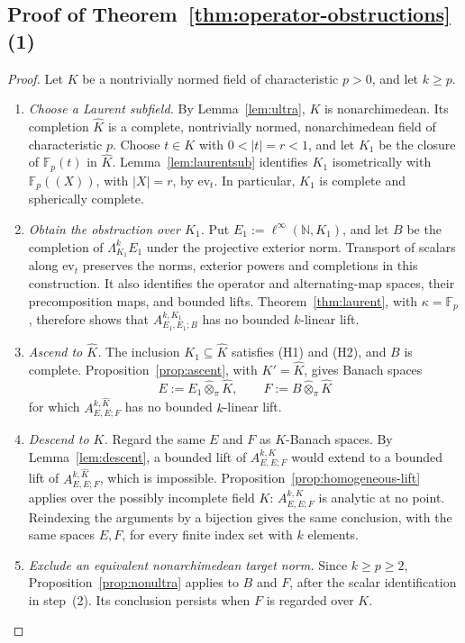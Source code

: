\documentclass[11pt]{amsart}
\theoremstyle{definition}
\theoremstyle{remark}
\numberwithin{equation}{section}
\newcommand{\N}{\mathbb N}
\newcommand{\F}{\mathbb F}
\newcommand{\linf}{\ell^\infty}
\newcommand{\abs}[1]{\lvert #1\rvert}
\newcommand{\Kh}{\widehat K}
\begin{document}
\subsection{Proof of Theorem~\ref{thm:operator-obstructions}(1)}
\begin{proof}
Let $K$ be a nontrivially normed field of characteristic $p>0$, and let $k\ge p$.
\begin{enumerate}
\item \emph{Choose a Laurent subfield.} By Lemma~\ref{lem:ultra}, $K$ is nonarchimedean. Its completion $\Kh$ is
a complete, nontrivially normed, nonarchimedean field of characteristic $p$. Choose $t\in K$ with
$0<\abs t=r<1$, and let $K_1$ be the closure of $\F_p(t)$ in $\Kh$. Lemma~\ref{lem:laurentsub} identifies $K_1$
isometrically with $\F_p((X))$, with $\abs X=r$, by $\mathrm{ev}_t$. In particular, $K_1$ is complete and
spherically complete.
\item \emph{Obtain the obstruction over $K_1$.} Put $E_1:=\linf(\N,K_1)$, and let $B$ be the completion of
$\Lambda^k_{K_1}E_1$ under the projective exterior norm. Transport of scalars along $\mathrm{ev}_t$ preserves
the norms, exterior powers and completions in this construction. It also identifies the operator and
alternating-map spaces, their precomposition maps, and bounded lifts. Theorem~\ref{thm:laurent}, with
$\kappa=\F_p$, therefore shows that $A^{k,K_1}_{E_1,E_1;B}$ has no bounded $k$\nobreakdash-linear lift.
\item \emph{Ascend to $\Kh$.} The inclusion $K_1\subseteq\Kh$ satisfies (H1) and (H2), and $B$ is complete.
Proposition~\ref{prop:ascent}, with $K'=\Kh$, gives Banach spaces
\[
E:=E_1\widehat\otimes_\pi\Kh,\qquad F:=B\widehat\otimes_\pi\Kh
\]
for which $A^{k,\Kh}_{E,E;F}$ has no bounded $k$\nobreakdash-linear lift.
\item \emph{Descend to $K$.} Regard the same $E$ and $F$ as $K$\nobreakdash-Banach spaces. By
Lemma~\ref{lem:descent}, a bounded lift of $A^{k,K}_{E,E;F}$ would extend to a bounded lift of
$A^{k,\Kh}_{E,E;F}$, which is impossible. Proposition~\ref{prop:homogeneous-lift} applies over the possibly incomplete
field $K$: $A^{k,K}_{E,E;F}$ is analytic at no point. Reindexing the arguments by a bijection gives the same conclusion, with the same spaces $E,F$, for every finite index set with $k$ elements.
\item \emph{Exclude an equivalent nonarchimedean target norm.} Since $k\ge p\ge2$, Proposition~\ref{prop:nonultra}
applies to $B$ and $F$, after the scalar identification in step~(2). Its conclusion persists when $F$ is
regarded over $K$.\qedhere
\end{enumerate}
\end{proof}
\end{document}

